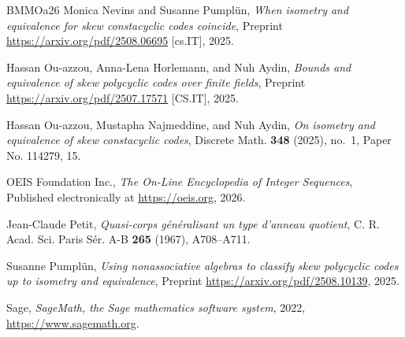 \documentclass[11pt]{amsart}
\theoremstyle{plain}
\theoremstyle{definition}
\numberwithin{equation}{section}
\numberwithin{figure}{section}
\begin{document}
\begin{thebibliography}{BMMOa26}
Monica Nevins and Susanne Pumpl\"un, \emph{When isometry and equivalence for skew constacyclic codes coincide}, Preprint \url{https://arxiv.org/pdf/2508.06695} [cs.IT], 2025.

Hassan Ou-azzou, Anna-Lena Horlemann, and Nuh Aydin, \emph{Bounds and equivalence of skew polycyclic codes over finite fields}, Preprint \url{https://arxiv.org/pdf/2507.17571} [CS.IT], 2025.

Hassan Ou-azzou, Mustapha Najmeddine, and Nuh Aydin, \emph{On isometry and equivalence of skew constacyclic codes}, Discrete Math. \textbf{348} (2025), no.~1, Paper No. 114279, 15. 

{OEIS Foundation Inc.}, \emph{The {O}n-{L}ine {E}ncyclopedia of {I}nteger {S}equences}, Published electronically at \url{https://oeis.org}, 2026.

Jean-Claude Petit, \emph{Quasi-corps g\'en\'eralisant un type d'anneau quotient}, C. R. Acad. Sci. Paris S\'er. A-B \textbf{265} (1967), A708--A711. 

Susanne Pumpl\"un, \emph{Using nonassociative algebras to classify skew polycyclic codes up to isometry and equivalence}, Preprint \url{https://arxiv.org/pdf/2508.10139}, 2025.

{Sage}, \emph{{SageMath}, the {Sage} mathematics software system}, 2022, \url{https://www.sagemath.org}.

\end{thebibliography}
\end{document}
